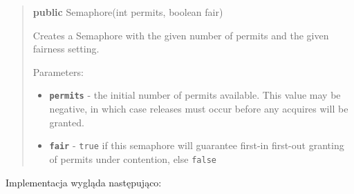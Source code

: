\documentclass[11pt]{article}
\providecommand{\tightlist}{%
      \setlength{\itemsep}{0pt}\setlength{\parskip}{0pt}}
\newenvironment{Shaded}{}{}
\newcommand{\KeywordTok}[1]{\textcolor[rgb]{0.00,0.44,0.13}{\textbf{{#1}}}}
\newcommand{\DataTypeTok}[1]{\textcolor[rgb]{0.56,0.13,0.00}{{#1}}}
\newcommand{\NormalTok}[1]{{#1}}
\newcommand{\OperatorTok}[1]{\textcolor[rgb]{0.40,0.40,0.40}{{#1}}}
\newcommand{\BuiltInTok}[1]{{#1}}
\begin{document}
\begin{quote}
\begin{Shaded}
\begin{Highlighting}[]
\KeywordTok{public} \BuiltInTok{Semaphore}\OperatorTok{(}\DataTypeTok{int}\NormalTok{ permits}\OperatorTok{,} \DataTypeTok{boolean}\NormalTok{ fair}\OperatorTok{)}
\end{Highlighting}
\end{Shaded}

Creates a Semaphore with the given number of permits and the given
fairness setting.

Parameters:

\begin{itemize}
\tightlist
\item
  \textbf{\texttt{permits}} - the initial number of permits available.
  This value may be negative, in which case releases must occur before
  any acquires will be granted.
\item
  \textbf{\texttt{fair}} - \texttt{true} if this semaphore will
  guarantee first-in first-out granting of permits under contention,
  else \texttt{false}
\end{itemize}
\end{quote}

Implementacja wygląda następująco:
\end{document}
